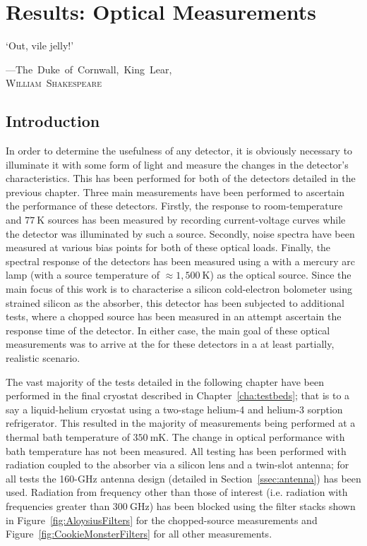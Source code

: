 \chapter{Results: Optical Measurements}
\label{cha:opticalResults}
%
\epigraph{`Out, vile jelly!'}{\mbox{\textup{---The Duke of Cornwall, King Lear,}}\\ \mbox{\textup{\textsc{William Shakespeare}}}}
%
\section{Introduction}\label{sec:opticalresults_introduction}
In order to determine the usefulness of any detector, it is obviously necessary to illuminate it with some form of light and measure the changes in the detector's characteristics. This has been performed for both of the detectors detailed in the previous chapter. Three main measurements have been performed to ascertain the performance of these detectors. Firstly, the response to room-temperature and $77~\mathrm{K}$ sources has been measured by recording current-voltage curves while the detector was illuminated by such a source. Secondly, noise spectra have been measured at various bias points for both of these optical loads. Finally, the spectral response of the detectors has been measured using a  with a mercury arc lamp (with a source temperature of $\approx 1,500~\mathrm{K}$) as the optical source. Since the main focus of this work is to characterise a silicon cold-electron bolometer using strained silicon as the absorber, this detector has been subjected to additional tests, where a chopped source has been measured in an attempt ascertain the response time of the detector. In either case, the main goal of these optical measurements was to arrive at the  for these detectors in a at least partially, realistic scenario.
\par 
The vast majority of the tests detailed in the following chapter have been performed in the final cryostat described in Chapter~\ref{cha:testbeds}; that is to a say a liquid-helium cryostat using a two-stage helium-4 and helium-3 sorption refrigerator. This resulted in the majority of measurements being performed at a thermal bath temperature of $350~\mathrm{mK}$. The change in optical performance with bath temperature has not been measured. All testing has been performed with radiation coupled to the absorber via a silicon lens and a twin-slot antenna; for all tests the 160-GHz antenna design (detailed in Section~\ref{ssec:antenna}) has been used. Radiation from frequency other than those of interest (i.e. radiation with frequencies greater than $300~\mathrm{GHz}$) has been blocked using the filter stacks shown in Figure~\ref{fig:AloysiusFilters} for the chopped-source measurements and Figure~\ref{fig:CookieMonsterFilters} for all other measurements.
%
